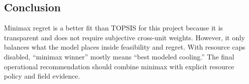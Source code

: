 
\subsection{Conclusion}
 
Minimax regret is a better fit than TOPSIS for this project because it is transparent and does not require subjective cross-unit weights. However, it only balances what the model places inside feasibility and regret. With resource caps disabled, ``minimax winner'' mostly means ``best modeled cooling.'' The final operational recommendation should combine minimax with explicit resource policy and field evidence.